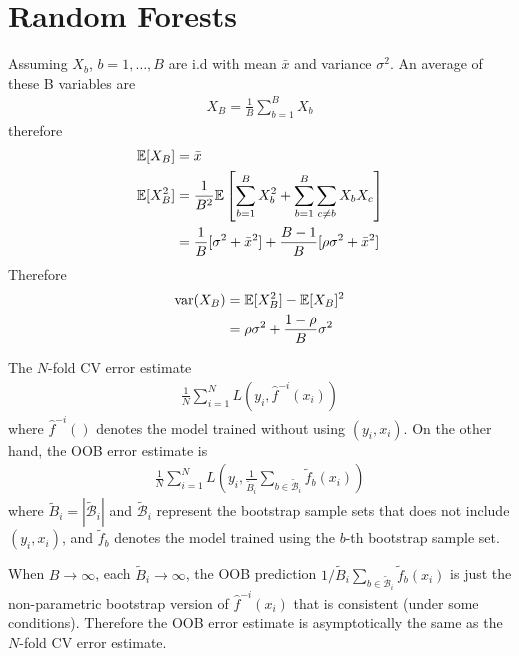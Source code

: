 \chapter{Random Forests}
\label{ch:15}

\begin{exercise}
  Assuming $X_b$, $b = 1,\ldots, B$ are i.d with mean $\bar{x}$
  and variance $\sigma^2$. An average of these B variables are
  \begin{align}
    X_B = \frac{1}{B}\sum_{b=1}^B X_b
  \end{align}
  therefore
  \begin{align}
    \mathbb{E}[X_B] & = \bar{x} \\
    \mathbb{E}[X_B^2] & = \frac{1}{B^2}\mathbb{E}\left[\sum_{b=1}^BX_b^2 +
    \sum_{b=1}^B\sum_{c\not=b}X_bX_c \right] \notag \\
    &= \frac{1}{B}[\sigma^2 + \bar{x}^2] + \frac{B-1}{B}[\rho\sigma^2 +
    \bar{x}^2]
  \end{align}
  Therefore
  \begin{align}
    \mbox{var}(X_B) & = \mathbb{E}[X_B^2] - \mathbb{E}[X_B]^2 \notag\\
    & = \rho\sigma^2 + \frac{1 - \rho}{B}\sigma^2
  \end{align}
\end{exercise}

\begin{exercise}
  The $N$-fold CV error estimate
  \begin{align}
    \frac{1}{N}\sum_{i=1}^NL(y_i,\hat{f}^{-i}(x_i))
  \end{align}
  where $\hat{f}^{-i}()$ denotes the model trained without using $(y_i,
  x_i)$. On the other hand,  the OOB error estimate is
  \begin{align}
    \frac{1}{N}\sum_{i=1}^NL(y_i,
    \frac{1}{\tilde{B}_i}\sum_{b\in\mathcal{\tilde{B}}_i}\tilde{f}_b(x_i))
  \end{align}
  where $\tilde{B}_i = |\mathcal{\tilde{B}}_i|$ and $\mathcal{\tilde{B}}_i$
  represent the bootstrap sample sets that does not include $(y_i,
  x_i)$, and $\tilde{f}_b$ denotes the model trained using the $b$-th bootstrap
  sample set.
  
  When $B\rightarrow\infty$, each $\tilde{B}_i\rightarrow\infty$, the OOB
  prediction
  $1/\tilde{B}_i\sum_{b\in\mathcal{\tilde{B}}_i}\tilde{f}_b(x_i)$ is
  just the non-parametric bootstrap version of $\hat{f}^{-i}(x_i)$ that is
  consistent (under some conditions).
  Therefore the OOB error estimate is asymptotically the same as the $N$-fold CV
  error estimate.
\end{exercise}

